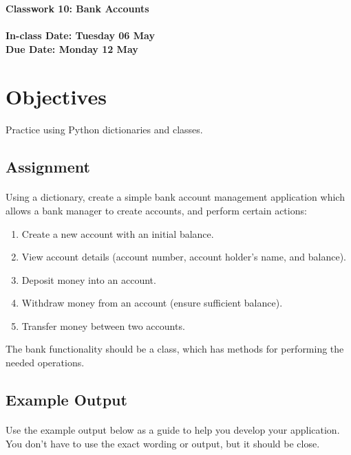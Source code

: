 \documentclass[letter,10pt]{article}
\begin{document}
    
    \huge
    \textbf{Classwork 10: Bank Accounts}
    \normalsize
    \\ ~~ \\
    \textbf{In-class Date: Tuesday 06 May} \\
    \textbf{Due Date: Monday 12 May}
    
    \section*{Objectives}
    \paragraph{}Practice using Python dictionaries and classes.
    
    \subsection*{Assignment}
    \paragraph{}Using a dictionary, create a simple bank account management application which allows a bank manager to create accounts, and perform certain actions:
    \begin{enumerate}
        \item Create a new account with an initial balance.
        \item View account details (account number, account holder's name, and balance).
        \item Deposit money into an account.
        \item Withdraw money from an account (ensure sufficient balance).
        \item Transfer money between two accounts.
    \end{enumerate}
    
    The bank functionality should be a class, which has methods for performing the needed operations.
    
    \subsection*{Example Output}
    \paragraph{}Use the example output below as a guide to help you develop your application. You don't have to use the exact wording or output, but it should be close.
    
\end{document}
